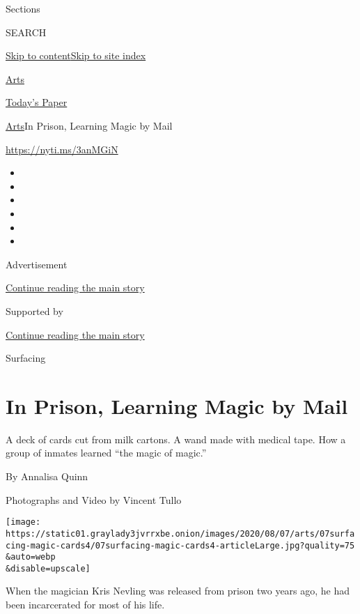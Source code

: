 Sections

SEARCH

\protect\hyperlink{site-content}{Skip to
content}\protect\hyperlink{site-index}{Skip to site index}

\href{https://www.nytimes3xbfgragh.onion/section/arts}{Arts}

\href{https://myaccount.nytimes3xbfgragh.onion/auth/login?response_type=cookie\&client_id=vi}{}

\href{https://www.nytimes3xbfgragh.onion/section/todayspaper}{Today's
Paper}

\href{/section/arts}{Arts}\textbar{}In Prison, Learning Magic by Mail

\url{https://nyti.ms/3anMGiN}

\begin{itemize}
\item
\item
\item
\item
\item
\item
\end{itemize}

Advertisement

\protect\hyperlink{after-top}{Continue reading the main story}

Supported by

\protect\hyperlink{after-sponsor}{Continue reading the main story}

Surfacing

\hypertarget{in-prison-learning-magic-by-mail}{%
\section{In Prison, Learning Magic by
Mail}\label{in-prison-learning-magic-by-mail}}

A deck of cards cut from milk cartons. A wand made with medical tape.
How a group of inmates learned ``the magic of magic.''

By Annalisa Quinn

Photographs and Video by Vincent Tullo

\texttt{[image: https://static01.graylady3jvrrxbe.onion/images/2020/08/07/arts/07surfacing-magic-cards4/07surfacing-magic-cards4-articleLarge.jpg?quality=75\\\&auto=webp\\\&disable=upscale]}

When the magician Kris Nevling was released from prison two years ago,
he had been incarcerated for most of his life.

